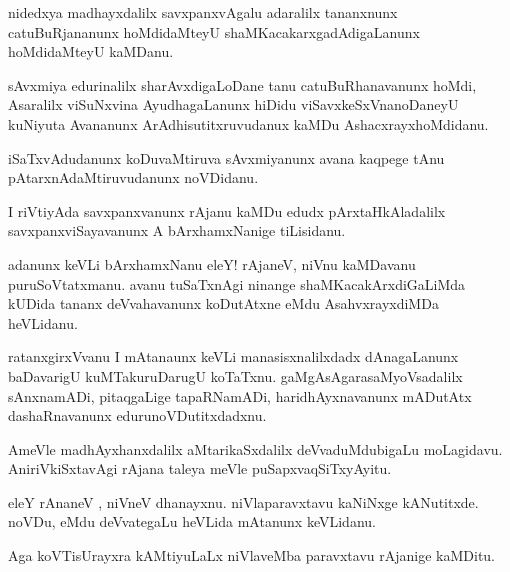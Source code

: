 \documentclass{article}
\begin{document}
\begin{mn}%
nidedxya madhayxdalilx savxpanxvAgalu adaralilx tananxnunx catuBuRjananunx hoMdidaMteyU 
shaMKacakarxgadAdigaLanunx hoMdidaMteyU kaMDanu.
\end{mn}

\begin{mn}%
sAvxmiya edurinalilx sharAvxdigaLoDane tanu catuBuRhanavanunx hoMdi, Asaralilx viSuNxvina 
AyudhagaLanunx hiDidu viSavxkeSxVnanoDaneyU kuNiyuta Avananunx ArAdhisutitxruvudanux kaMDu
AshacxrayxhoMdidanu.
\end{mn}

\begin{mn}%
iSaTxvAdudanunx koDuvaMtiruva sAvxmiyanunx avana kaqpege tAnu pAtarxnAdaMtiruvudanunx 
noVDidanu.
\end{mn}

\begin{mn}%
I riVtiyAda savxpanxvanunx rAjanu kaMDu edudx pArxtaHkAladalilx savxpanxviSayavanunx A 
bArxhamxNanige tiLisidanu.
\end{mn}

\begin{mn}%
adanunx keVLi bArxhamxNanu eleY! rAjaneV, niVnu kaMDavanu puruSoVtatxmanu. avanu 
tuSaTxnAgi ninange shaMKacakArxdiGaLiMda kUDida tananx deVvahavanunx koDutAtxne eMdu 
AsahvxrayxdiMDa heVLidanu.
\end{mn}

\begin{mn}%
ratanxgirxVvanu I mAtanaunx keVLi manasisxnalilxdadx dAnagaLanunx baDavarigU 
kuMTakuruDarugU koTaTxnu. gaMgAsAgarasaMyoVsadalilx sAnxnamADi, pitaqgaLige tapaRNamADi, 
haridhAyxnavanunx mADutAtx dashaRnavanunx edurunoVDutitxdadxnu.
\end{mn}

\begin{mn}%
AmeVle madhAyxhanxdalilx aMtarikaSxdalilx deVvaduMdubigaLu moLagidavu. AniriVkiSxtavAgi 
rAjana taleya meVle puSapxvaqSiTxyAyitu.
\end{mn}

\begin{mn}%
eleY rAnaneV , niVneV dhanayxnu. niVlaparavxtavu kaNiNxge kANutitxde. noVDu, eMdu 
deVvategaLu heVLida mAtanunx keVLidanu.
\end{mn}

\begin{mn}%
Aga koVTisUrayxra kAMtiyuLaLx niVlaveMba paravxtavu rAjanige kaMDitu.
\end{mn}
\end{document}
